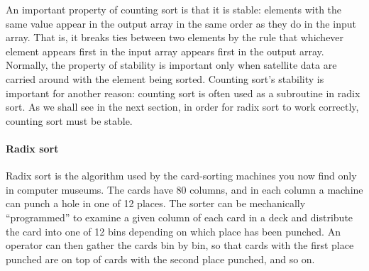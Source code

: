 An important property of counting sort is that it is stable: elements with the same value appear in the output array in the same order as they do in the input array. That is, it breaks ties between two elements by the rule that whichever element appears first in the input array appears first in the output array. Normally, the property of stability is important only when satellite data are carried around with the element being sorted. Counting sort’s stability is important for another reason: counting sort is often used as a subroutine in radix sort. As we shall see in the next section, in order for radix sort to work correctly, counting sort must be stable.

\paragraph{Radix sort}
Radix sort is the algorithm used by the card-sorting machines you now find only in computer museums. The cards have 80 columns, and in each column a machine can punch a hole in one of 12 places. The sorter can be mechanically “programmed” to examine a given column of each card in a deck and distribute the card into one of 12 bins depending on which place has been punched. An operator can then gather the cards bin by bin, so that cards with the first place punched are on top of cards with the second place punched, and so on.

